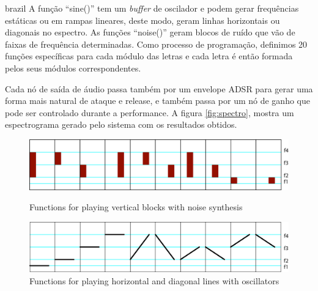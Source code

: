 \begin{otherlanguage*}{brazil}
A função ``sine()'' tem um \emph{buffer} de oscilador e podem gerar frequências estáticas ou em rampas lineares, deste modo, geram linhas horizontais ou diagonais no espectro. As funções ``noise()'' geram blocos de ruído que vão de faixas de frequência determinadas. Como processo de programação, definimos 20 funções específicas para cada módulo das letras e cada letra é então formada pelos seus módulos correspondentes. 






Cada nó de saída de áudio passa também por um envelope ADSR \cite{Lee2016} para gerar uma forma mais natural de ataque e release, e também passa por um nó de ganho que pode ser controlado durante a performance. A figura \ref{fig:spectro}, mostra um espectrograma gerado pelo sistema com os resultados obtidos.


\begin{figure}[!ht]
    \centering
        \includegraphics[width=1\textwidth]{pictures/audiotype_v1_noise}
        \vspace{-10pt}
    \caption{Functions for playing vertical blocks with noise synthesis}
    \vspace{10pt}
    \label{fig:noise}
        \centering
        \includegraphics[width=1\textwidth]{pictures/audiotype_v1_sine}
    \caption{Functions for playing horizontal and diagonal lines with oscillators}
    \vspace{-10pt}
    \label{fig:sine}
\vspace{10pt}
\end{figure}


\end{otherlanguage*}
